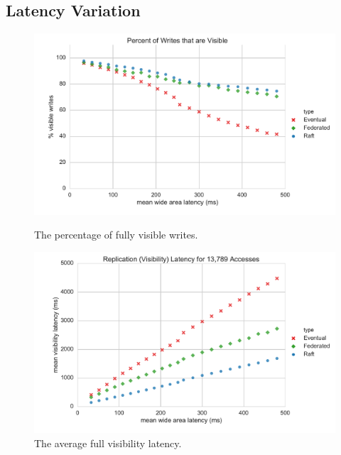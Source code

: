 \documentclass[10pt,conference,letterpaper]{IEEEtran}
\begin{document}
\subsection{Latency Variation}

\begin{figure}[t]
    \centering
      \includegraphics[width=\linewidth]{figures/latency/percent_visible_writes}
      \caption{The percentage of fully visible writes.}\label{fig:visible_writes}
    \endminipage\hfill
      \includegraphics[width=\linewidth]{figures/latency/visibility_latency}
      \caption{The average full visibility latency.}\label{fig:visibility_latency}
    \endminipage\hfill
\end{figure}
\end{document}
